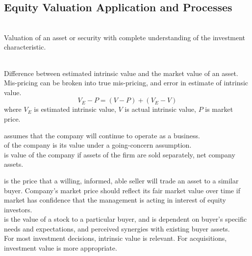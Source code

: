 \subsection{Equity Valuation Application and Processes}

\begin{definition} \\
Valuation of an asset or security with complete understanding of the investment characteristic.
\end{definition}

\begin{definition} \\
Difference between estimated intrinsic value and the market value of an asset.\\
Mis-pricing can be broken into true mis-pricing, and error in estimate of intrinsic value.
\begin{equation}
V_E - P = (V - P) + (V_E - V) \nonumber
\end{equation}
where $V_E$ is estimated intrinsic value, $V$ is actual intrinsic value, $P$ is market price.
\end{definition}

\begin{definition}  assumes that the company will continue to operate as a business.\\
 of the company is its value under a going-concern assumption.\\
 is value of the company if assets of the firm are sold separately, net company assets.
\end{definition}

\begin{definition}  is the price that a willing, informed, able seller will trade an asset to a similar buyer. Company's market price should reflect its fair market value over time if market has confidence that the management is acting in interest of equity investors.\\
 is the value of a stock to a particular buyer, and is dependent on buyer's specific needs and expectations, and perceived synergies with existing buyer assets.\\
For most investment decisions, intrinsic value is relevant. For acquisitions, investment value is more appropriate.
\end{definition}

